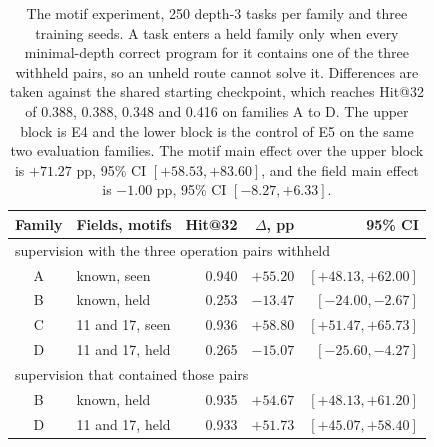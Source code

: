 \begin{table}[!tbh]
\centering\scriptsize\setlength{\tabcolsep}{4pt}
\begin{tabular}{|c|l|r|r|r|}
\hline
\textbf{Family} & \textbf{Fields, motifs} & \textbf{Hit@32} & \textbf{$\Delta$, pp} & \textbf{95\% CI} \\
\hline
\multicolumn{5}{|l|}{supervision with the three operation pairs withheld} \\ \hline
A & known, seen  & 0.940 & $+55.20$ & $[+48.13, +62.00]$ \\ \hline
B & known, held  & 0.253 & $-13.47$ & $[-24.00, -2.67]$ \\ \hline
C & 11 and 17, seen & 0.936 & $+58.80$ & $[+51.47, +65.73]$ \\ \hline
D & 11 and 17, held & 0.265 & $-15.07$ & $[-25.60, -4.27]$ \\ \hline
\multicolumn{5}{|l|}{supervision that contained those pairs} \\ \hline
B & known, held  & 0.935 & $+54.67$ & $[+48.13, +61.20]$ \\ \hline
D & 11 and 17, held & 0.933 & $+51.73$ & $[+45.07, +58.40]$ \\ \hline
\end{tabular}
\caption{The motif experiment, 250 depth-3 tasks per family and three training
seeds. A task enters a held family only when every minimal-depth correct program
for it contains one of the three withheld pairs, so an unheld route cannot solve
it. Differences are taken against the shared starting checkpoint, which reaches
Hit@32 of 0.388, 0.388, 0.348 and 0.416 on families A to D. The upper block is E4
and the lower block is the control of E5 on the same two evaluation families. The
motif main effect over the upper block is $+71.27$ pp, 95\% CI $[+58.53, +83.60]$,
and the field main effect is $-1.00$ pp, 95\% CI $[-8.27, +6.33]$.}
\label{tab:motif}
\end{table}
